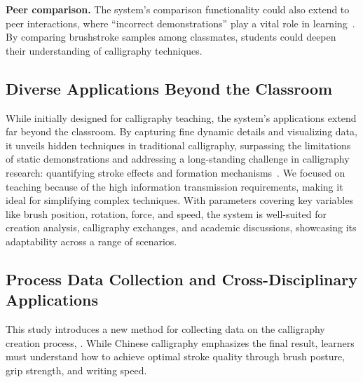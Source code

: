 \textbf{ Peer comparison.} The system’s comparison functionality could also extend to peer interactions, where ``incorrect demonstrations'' play a vital role in learning~\cite{BOOTH201324}. By comparing brushstroke samples among classmates, students could deepen their understanding of calligraphy techniques.


\subsection{Diverse Applications Beyond the Classroom}
While initially designed for calligraphy teaching, the system's applications extend far beyond the classroom. By capturing fine dynamic details and visualizing data, it unveils hidden techniques in traditional calligraphy, surpassing the limitations of static demonstrations and addressing a long-standing challenge in calligraphy research: quantifying stroke effects and formation mechanisms~\cite{shi2023aesthetics}. We focused on teaching because of the high information transmission requirements, making it ideal for simplifying complex techniques. With parameters covering key variables like brush position, rotation, force, and speed, the system is well-suited for creation analysis, calligraphy exchanges, and academic discussions, showcasing its adaptability across a range of scenarios.

\subsection{Process Data Collection and Cross-Disciplinary Applications}
This study introduces a new method for collecting data on the calligraphy creation process, . While Chinese calligraphy emphasizes the final result, learners must understand how to achieve optimal stroke quality through brush posture, grip strength, and writing speed. 

